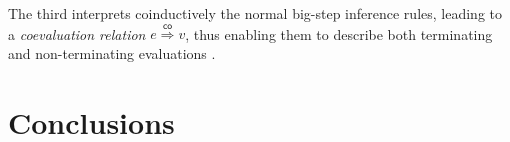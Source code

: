 \documentclass[12pt,a2paper,draft]{article}
\begin{document}
The third interprets coinductively the normal big-step inference rules, leading to a \emph{coevaluation
relation} $e \stackrel{\mathsf{co}}{\Rightarrow} v$, thus enabling them to describe both terminating
and non-terminating evaluations \cite{LeroyGrall09}.


\section{Conclusions}




\end{document}
